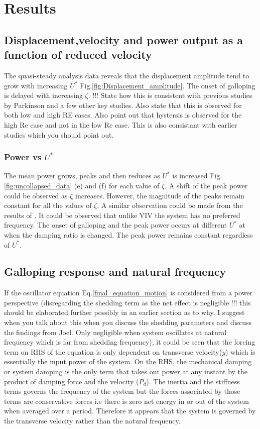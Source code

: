 
\section{Results}


\subsection{Displacement,velocity and power output as a function of reduced velocity}


 The quasi-steady analysis data reveals that the displacement amplitude tend to grow with increasing $U^*$ Fig.\ref{fig:Displacement_amplitude}. The onset of galloping is delayed with increasing $\zeta$.  !!! State how this is consistent with previous studies by Parkinson and a few other key studies. Also state that this is observed for both low and high RE cases. Also point out that hystersis is observed for the high Re case and not in the low Re case. This is also consistant with earlier studies which you should point out.
 
 \subsubsection*{Power vs $U^*$}
 
 The mean power grows, peaks and then reduces as $U^*$ is increased Fig.\ref{fig:uncollapsed_data} (e) and (f) for each value of $\zeta$. A shift of the peak power could be observed as $\zeta$ increases. However, the magnitude of the peaks remain constant for all the values of $\zeta$. A similar observation could be made from the results of \cite{Barrero-Gil2010a}. It could be observed that unlike VIV the  system has no preferred frequency. The onset of galloping and the peak power occurs at different $U^*$ at when the damping ratio is changed. The peak power remains constant regardless of $U^*$.
 
 \subsection{Galloping response and natural frequency}
 
 If the oscillator equation Eq.\eqref{final_equation_motion} is considered from a power perspective (disregarding the shedding term as the net effect is negligible !!! this should be elaborated further possibly in an earlier section as to why. I suggest when you talk about this when you discuss the shedding parameters and discuss the findings from Joel. Only negligible when system oscillates at natural frequency which is far from shedding frequency), it could be seen that the forcing term on RHS of the equation is only dependent on transverse velocity($\dot{y}$) which is essentially the input power of the system. On the RHS, the mechanical damping or system damping is the only term that takes out power at any instant by the product of damping force and the velocity ($P_d$). The inertia and the stiffness terms governs the frequency of the system but the forces associated by those terms are conservative forces i.e there is zero net energy in or out of the system when averaged over a period. Therefore it appears that the system is governed by the transverse velocity rather than the natural frequency.
 


